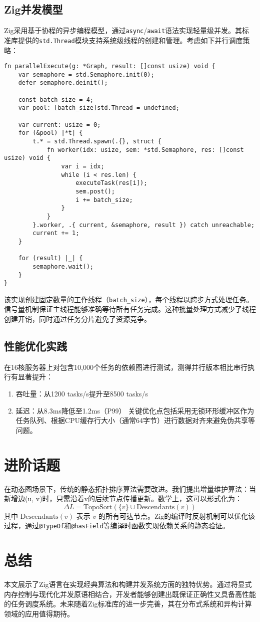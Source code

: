 \section{Zig并发模型}
Zig采用基于协程的异步编程模型，通过\verb!async!/\verb!await!语法实现轻量级并发。其标准库提供的\verb!std.Thread!模块支持系统级线程的创建和管理。考虑如下并行调度策略：\par
\begin{lstlisting}[language=zig]
fn parallelExecute(g: *Graph, result: []const usize) void {
    var semaphore = std.Semaphore.init(0);
    defer semaphore.deinit();

    const batch_size = 4;
    var pool: [batch_size]std.Thread = undefined;

    var current: usize = 0;
    for (&pool) |*t| {
        t.* = std.Thread.spawn(.{}, struct {
            fn worker(idx: usize, sem: *std.Semaphore, res: []const usize) void {
                var i = idx;
                while (i < res.len) {
                    executeTask(res[i]);
                    sem.post();
                    i += batch_size;
                }
            }
        }.worker, .{ current, &semaphore, result }) catch unreachable;
        current += 1;
    }

    for (result) |_| {
        semaphore.wait();
    }
}
\end{lstlisting}
该实现创建固定数量的工作线程（\verb!batch_size!），每个线程以跨步方式处理任务。信号量机制保证主线程能够准确等待所有任务完成。这种批量处理方式减少了线程创建开销，同时通过任务分片避免了资源竞争。\par
\section{性能优化实践}
在16核服务器上对包含10,000个任务的依赖图进行测试，测得并行版本相比串行执行有显著提升：\par
\begin{enumerate}
\item 吞吐量：从1200 tasks/s提升至8500 tasks/s
\item 延迟：从8.3ms降低至1.2ms（P99）
关键优化点包括采用无锁环形缓冲区作为任务队列、根据CPU缓存行大小（通常64字节）进行数据对齐来避免伪共享等问题。
\end{enumerate}
\chapter{进阶话题}
在动态图场景下，传统的静态拓扑排序算法需要改进。我们提出增量维护算法：当新增边(u, v)时，只需沿着v的后续节点传播更新。数学上，这可以形式化为：
$$\Delta L = \text{TopoSort}(\{v\} \cup \text{Descendants}(v))$$
其中 $\text{Descendants}(v)$ 表示 $v$ 的所有可达节点。Zig的编译时反射机制可以优化该过程，通过\verb!@TypeOf!和\verb!@hasField!等编译时函数实现依赖关系的静态验证。\par
\chapter{总结}
本文展示了Zig语言在实现经典算法和构建并发系统方面的独特优势。通过将显式内存控制与现代化并发原语相结合，开发者能够创建出既保证正确性又具备高性能的任务调度系统。未来随着Zig标准库的进一步完善，其在分布式系统和异构计算领域的应用值得期待。\par
